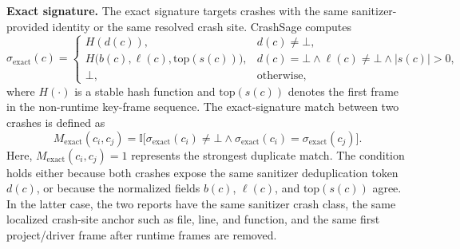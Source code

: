 \documentclass[pdflatex,sn-basic]{sn-jnl}%
\theoremstyle{thmstyleone}%
\theoremstyle{thmstyletwo}%
\theoremstyle{thmstylethree}%
\begin{document}
\textbf{Exact signature.} The exact signature targets crashes with the same sanitizer-provided identity or the same resolved crash site.
CrashSage computes
\begin{equation}
\sigma_{\mathrm{exact}}(c)=
\begin{cases}
H(d(c)), & d(c)\neq \bot,\\
H\bigl(b(c),\ell(c),\mathrm{top}(s(c))\bigr), & d(c)=\bot \land \ell(c)\neq \bot \land |s(c)|>0,\\
\bot, & \text{otherwise},
\end{cases}
\end{equation}
where \(H(\cdot)\) is a stable hash function and \(\mathrm{top}(s(c))\) denotes the first frame in the non-runtime key-frame sequence.
The exact-signature match between two crashes is defined as
\begin{equation}
M_{\mathrm{exact}}(c_i,c_j)=
\mathbb{I}\bigl[
\sigma_{\mathrm{exact}}(c_i)\neq \bot
\land \sigma_{\mathrm{exact}}(c_i)=\sigma_{\mathrm{exact}}(c_j)
\bigr].
\end{equation}
Here, \(M_{\mathrm{exact}}(c_i,c_j)=1\) represents the strongest duplicate match.
The condition holds either because both crashes expose the same sanitizer deduplication token \(d(c)\), or because the normalized fields \(b(c)\), \(\ell(c)\), and \(\mathrm{top}(s(c))\) agree.
In the latter case, the two reports have the same sanitizer crash class, the same localized crash-site anchor such as file, line, and function, and the same first project/driver frame after runtime frames are removed.
\end{document}
